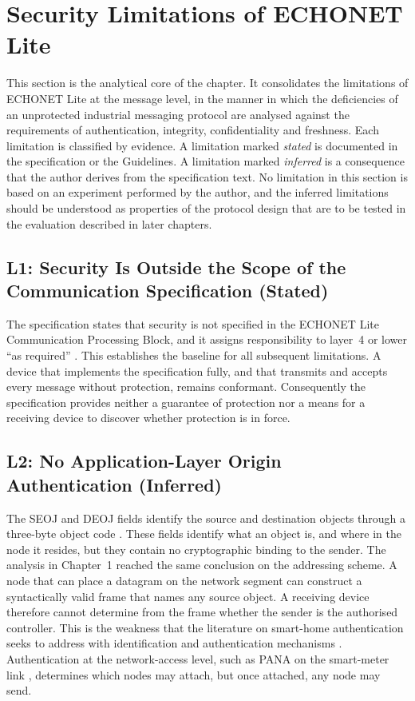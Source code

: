 \section{Security Limitations of ECHONET Lite}
\label{sec:flaws}

This section is the analytical core of the chapter. It consolidates the limitations of ECHONET Lite at the message level, in the manner in which the deficiencies of an unprotected industrial messaging protocol are analysed against the requirements of authentication, integrity, confidentiality and freshness. Each limitation is classified by evidence. A limitation marked \emph{stated} is documented in the specification or the Guidelines. A limitation marked \emph{inferred} is a consequence that the author derives from the specification text. No limitation in this section is based on an experiment performed by the author, and the inferred limitations should be understood as properties of the protocol design that are to be tested in the evaluation described in later chapters.

\subsection{L1: Security Is Outside the Scope of the Communication Specification (Stated)}

The specification states that security is not specified in the ECHONET Lite Communication Processing Block, and it assigns responsibility to layer~4 or lower ``as required'' \cite{ECHONETPart2}. This establishes the baseline for all subsequent limitations. A device that implements the specification fully, and that transmits and accepts every message without protection, remains conformant. Consequently the specification provides neither a guarantee of protection nor a means for a receiving device to discover whether protection is in force.

\subsection{L2: No Application-Layer Origin Authentication (Inferred)}

The SEOJ and DEOJ fields identify the source and destination objects through a three-byte object code \cite{ECHONETPart2}. These fields identify what an object is, and where in the node it resides, but they contain no cryptographic binding to the sender. The analysis in Chapter~1 reached the same conclusion on the addressing scheme. A node that can place a datagram on the network segment can construct a syntactically valid frame that names any source object. A receiving device therefore cannot determine from the frame whether the sender is the authorised controller. This is the weakness that the literature on smart-home authentication seeks to address with identification and authentication mechanisms \cite{AlJanah2021}. Authentication at the network-access level, such as PANA on the smart-meter link \cite{ECHONETGuidelines}, determines which nodes may attach, but once attached, any node may send.

